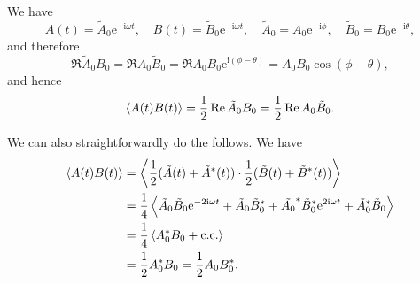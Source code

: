 \documentclass[hyperref, a4paper]{article}
\newcommand*{\ii}{\mathrm{i}}
\newcommand*{\ee}{\mathrm{e}}
\begin{document}
\subsubsection{}

We have 
\begin{equation}
    A(t) = \tilde{A}_0 \ee^{- \ii \omega t} , \quad 
    B(t) = \tilde{B}_0 \ee^{- \ii \omega t} , \quad 
    \tilde{A}_0 = A_0 \ee^{- \ii \phi}, \quad 
    \tilde{B}_0 = B_0 \ee^{- \ii \theta},
\end{equation}
and therefore 
\begin{equation}
    \Re \tilde{A}_0 B_0 = \Re A_0 \tilde{B}_0 = 
    \Re A_0 B_0 \ee^{\ii (\phi - \theta)}
    = A_0 B_0 \cos(\phi - \theta),
\end{equation}
and hence 
\begin{equation}
    \expval{A(t) B(t)} = \frac{1}{2} \Re \tilde{A}_0 B_0 
    = \frac{1}{2} \Re A_0 \tilde{B}_0 .
\end{equation}

We can also straightforwardly do the follows. 
We have 
\begin{equation}
    \begin{aligned}
        \expval{A(t) B(t)} &= \expval{
            \frac{1}{2} (\tilde{A}(t) + \tilde{A}^*(t))
            \cdot \frac{1}{2} (\tilde{B}(t) + \tilde{B}^*(t))
        } \\
        &= \frac{1}{4} \expval{
            \tilde{A}_0 \tilde{B}_0 \ee^{- 2 \ii \omega t} + 
            \tilde{A}_0 \tilde{B}_0^* + 
            \tilde{A_0}^* \tilde{B}_0^* \ee^{2 \ii \omega t} 
            + \tilde{A}_0^* \tilde{B}_0
        } \\
        &= \frac{1}{4} \expval{A_0^* B_0 + \text{c.c.}} \\
        &= \frac{1}{2} A_0^* B_0 = \frac{1}{2} A_0 B_0^*.
    \end{aligned}
\end{equation}

\subsubsection{}
\end{document}
